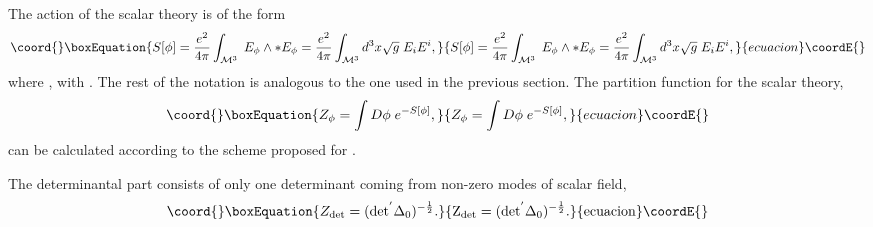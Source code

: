 \documentclass[a4paper,12pt]{article}
\begin{document}
The action of the scalar theory is of the form
\begin{equation}\coord{}\boxEquation{\label{T14}
S[\phi]= \frac{e^{2}}{4\pi}\int_{\mathcal{M}^{3}}\; E_{\phi}\wedge \ast E_{\phi}
=\frac{e^{2}}{4\pi} \int_{\mathcal{M}^{3}} d^{3}x \sqrt{g}\; E_{i} E^{i},
}{S[\phi]= \frac{e^{2}}{4\pi}\int_{\mathcal{M}^{3}}\; E_{\phi}\wedge \ast E_{\phi}
=\frac{e^{2}}{4\pi} \int_{\mathcal{M}^{3}} d^{3}x \sqrt{g}\; E_{i} E^{i},
}{ecuacion}\coordE{}\end{equation}
where \coordHE{}, with \myHighlight{$\phi \in [0,2\pi)$}\coordHE{}. The
rest of the notation is analogous to the one used in the previous
section. The partition function for the scalar theory,
\begin{equation}\coord{}\boxEquation{\label{T15}
Z_{\phi}=\int D\phi \; e^{-S[\phi]},
}{Z_{\phi}=\int D\phi \; e^{-S[\phi]},
}{ecuacion}\coordE{}\end{equation}
can be calculated according to the scheme proposed for \coordHE{}.

The determinantal part consists of only one determinant coming from non-zero modes of scalar field,
\begin{equation}\coord{}\boxEquation{\label{T16}
Z_{\rm det}=(\rm det^{'}\Delta_{0})^{-\frac{1}{2}}.
}{Z_{\rm det}=(\rm det^{'}\Delta_{0})^{-\frac{1}{2}}.
}{ecuacion}\coordE{}\end{equation}
\end{document}
